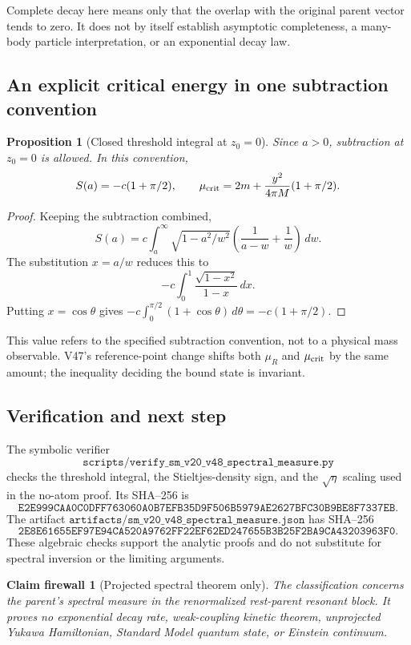 \documentclass[11pt]{article}
\newtheorem{proposition}[theorem]{Proposition}
\newtheorem{firewall}[theorem]{Claim firewall}
\theoremstyle{remark}
\begin{document}
Complete decay here means only that the overlap with the original
parent vector tends to zero.  It does not by itself establish
asymptotic completeness, a many-body particle interpretation, or
an exponential decay law.

\subsection{An explicit critical energy in one subtraction convention}

\begin{proposition}[Closed threshold integral at \(z_0=0\)]
\label{prop:v20v48-explicit}
Since \(a>0\), subtraction at \(z_0=0\) is allowed.  In this
convention,
\[
 S(a)=-c(1+\pi/2),\qquad
 \mu_{\rm crit}=2m+\frac{y^2}{4\pi M}(1+\pi/2).
\]
\end{proposition}
\begin{proof}
Keeping the subtraction combined,
\[
 S(a)=c\int_a^\infty\sqrt{1-a^2/w^2}
 \left(\frac1{a-w}+\frac1w\right)\,dw.
\]
The substitution \(x=a/w\) reduces this to
\[
 -c\int_0^1\frac{\sqrt{1-x^2}}{1-x}\,dx.
\]
Putting \(x=\cos\theta\) gives
\(-c\int_0^{\pi/2}(1+\cos\theta)\,d\theta=-c(1+\pi/2)\).
\end{proof}

This value refers to the specified subtraction convention, not
to a physical mass observable.  V47's reference-point change
shifts both \(\mu_R\) and \(\mu_{\rm crit}\) by the same amount;
the inequality deciding the bound state is invariant.

\subsection{Verification and next step}

The symbolic verifier
\[
 \texttt{scripts/verify\_sm\_v20\_v48\_spectral\_measure.py}
\]
checks the threshold integral, the Stieltjes-density sign, and
the \(\sqrt\eta\) scaling used in the no-atom proof.  Its SHA--256 is
\[
\texttt{E2E999CAA0C0DFF763060A0B7EFB35D9F506B5979AE2627BFC30B9BE8F7337EB}.
\]
The artifact
\(\texttt{artifacts/sm\_v20\_v48\_spectral\_measure.json}\)
has SHA--256
\[
\texttt{2E8E61655EF97E94CA520A9762FF22EF62ED247655B3B25F2BA9CA43203963F0}.
\]
These algebraic checks support the analytic proofs and do not
substitute for spectral inversion or the limiting arguments.

\begin{firewall}[Projected spectral theorem only]
\label{fire:v20v48}
The classification concerns the parent's spectral measure in the
renormalized rest-parent resonant block.  It proves no exponential
decay rate, weak-coupling kinetic theorem, unprojected Yukawa
Hamiltonian, Standard Model quantum state, or Einstein continuum.
\end{firewall}
\end{document}

